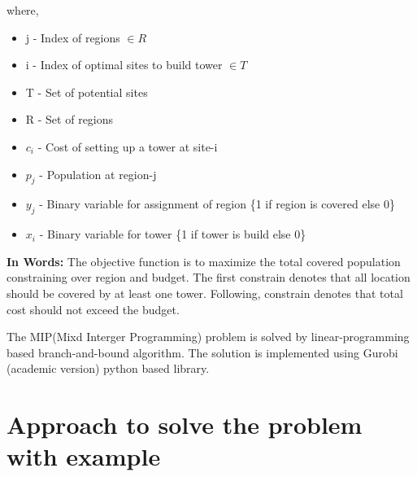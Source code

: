 \documentclass[preprint,12pt]{elsarticle}
\begin{document}
\begin{enumerate}
where,
\begin{itemize}
	\item j - Index of regions $\in R$
	\item i - Index of optimal sites to build tower $\in T$
	\item T - Set of potential sites
	\item R - Set of regions
	\item $c_i$ - Cost of setting up a tower at site-i
	\item $p_j$ - Population at region-j
	\item $y_j$ - Binary variable for assignment of region \{1 if region is covered else 0\}
	\item $x_i$ - Binary variable for tower  \{1 if tower  is build else 0\}
\end{itemize}

\subitem \textbf{In Words:}
The objective function is to maximize the total covered population constraining over region and budget. The first constrain denotes that all location should be covered by at least one tower. Following, constrain denotes that total cost should not exceed the budget.
\end{enumerate}




The MIP(Mixd Interger Programming) problem is solved by linear-programming based branch-and-bound algorithm\cite{gurobiSol}. The solution is implemented using Gurobi (academic version) python based library\cite{gurobi}.  


 
\section{Approach to solve the problem with example}
\end{document}
